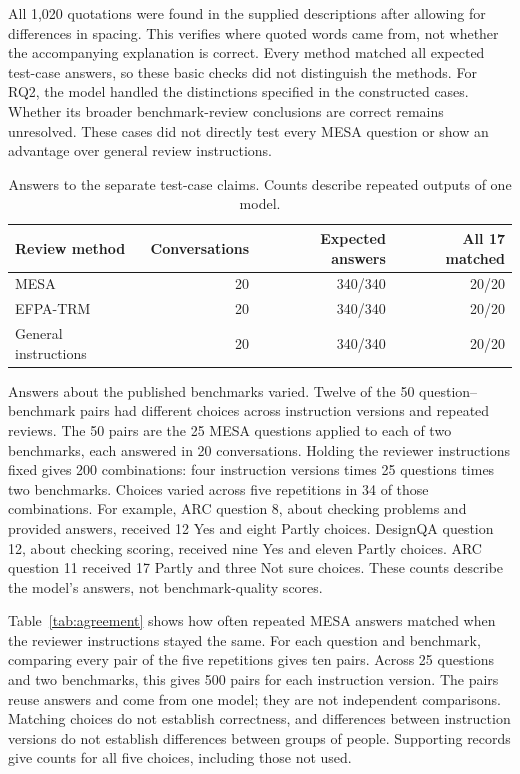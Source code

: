 \documentclass[10pt,conference]{IEEEtran}
\begin{document}
All 1,020 quotations were found in the supplied descriptions after allowing for differences in spacing. This verifies where quoted words came from, not whether the accompanying explanation is correct. Every method matched all expected test-case answers, so these basic checks did not distinguish the methods. For RQ2, the model handled the distinctions specified in the constructed cases. Whether its broader benchmark-review conclusions are correct remains unresolved. These cases did not directly test every MESA question or show an advantage over general review instructions.

\begin{table}[t]
\caption{Answers to the separate test-case claims. Counts describe repeated outputs of one model.}
\label{tab:controlled}
\centering
\begin{tabular}{@{}lrrr@{}}
\toprule
Review method & Conversations & Expected answers & All 17 matched \\
\midrule
MESA & 20 & 340/340 & 20/20 \\
EFPA-TRM & 20 & 340/340 & 20/20 \\
General instructions & 20 & 340/340 & 20/20 \\
\bottomrule
\end{tabular}
\end{table}

Answers about the published benchmarks varied. Twelve of the 50 question--benchmark pairs had different choices across instruction versions and repeated reviews. The 50 pairs are the 25 MESA questions applied to each of two benchmarks, each answered in 20 conversations. Holding the reviewer instructions fixed gives 200 combinations: four instruction versions times 25 questions times two benchmarks. Choices varied across five repetitions in 34 of those combinations. For example, ARC question 8, about checking problems and provided answers, received 12 Yes and eight Partly choices. DesignQA question 12, about checking scoring, received nine Yes and eleven Partly choices. ARC question 11 received 17 Partly and three Not sure choices. These counts describe the model's answers, not benchmark-quality scores.

Table~\ref{tab:agreement} shows how often repeated MESA answers matched when the reviewer instructions stayed the same. For each question and benchmark, comparing every pair of the five repetitions gives ten pairs. Across 25 questions and two benchmarks, this gives 500 pairs for each instruction version. The pairs reuse answers and come from one model; they are not independent comparisons. Matching choices do not establish correctness, and differences between instruction versions do not establish differences between groups of people. Supporting records give counts for all five choices, including those not used.
\end{document}
